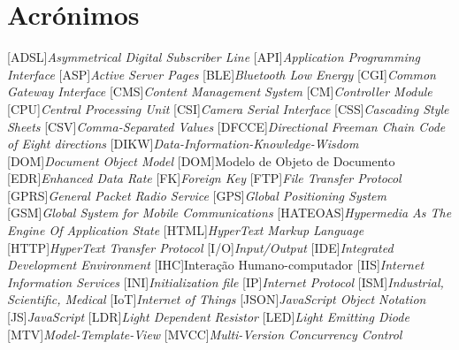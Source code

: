
\chapter*{Acrónimos}

\begin{multicols}{2}
	
\begin{acronym}[RELAX NG]
	
	[ADSL]{\textit{Asymmetrical Digital Subscriber Line}}
	[API]{\textit{Application Programming Interface}}
	[ASP]{\textit{Active Server Pages}}
	[BLE]{\textit{Bluetooth Low Energy}}
	[CGI]{\textit{Common Gateway Interface}}
	[CMS]{\textit{Content Management System}}
	[CM]{\textit{Controller Module}}
	[CPU]{\textit{Central Processing Unit}}
	[CSI]{\textit{Camera Serial Interface}}
	[CSS]{\textit{Cascading Style Sheets}}
	[CSV]{\textit{Comma-Separated Values}}
	[DFCCE]{\textit{Directional Freeman Chain Code of Eight directions}}
	[DIKW]{\textit{Data-Information-Knowledge-Wisdom}}
	[DOM]{\textit{Document Object Model}}
	[DOM]{Modelo de Objeto de Documento}
	[EDR]{\textit{Enhanced Data Rate}}
	[FK]{\textit{Foreign Key}}
	[FTP]{\textit{File Transfer Protocol}}
	[GPRS]{\textit{General Packet Radio Service}}
	[GPS]{\textit{Global Positioning System}}
	[GSM]{\textit{Global System for Mobile Communications}}
	[HATEOAS]{\textit{Hypermedia As The Engine Of Application State}}
	[HTML]{\textit{HyperText Markup Language}}
	[HTTP]{\textit{HyperText Transfer Protocol}}
	[I/O]{\textit{Input/Output}}
	[IDE]{\textit{Integrated Development Environment}}
	[IHC]{Interação Humano-computador}
	[IIS]{\textit{Internet Information Services}}
	[INI]{\textit{Initialization file}}
	[IP]{\textit{Internet Protocol}}
	[ISM]{\textit{Industrial, Scientific, Medical}}
	[IoT]{\textit{Internet of Things}}
	[JSON]{\textit{JavaScript Object Notation}}
	[JS]{\textit{JavaScript}}
	[LDR]{\textit{Light Dependent Resistor}}
	[LED]{\textit{Light Emitting Diode}}
	[MTV]{\textit{Model-Template-View}}
	[MVCC]{\textit{Multi-Version Concurrency Control}}

\end{acronym}
\end{multicols}
